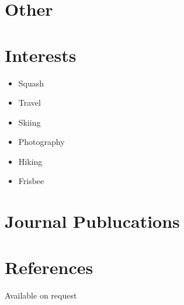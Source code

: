 \section{Other}


\section{Interests}
\begin{itemize}
  \item Squash
  \item Travel
  \item Skiing
  \item Photography
  \item Hiking
  \item Frisbee
\end{itemize}



\section{Journal Publucations}






\section{References}
Available on request



